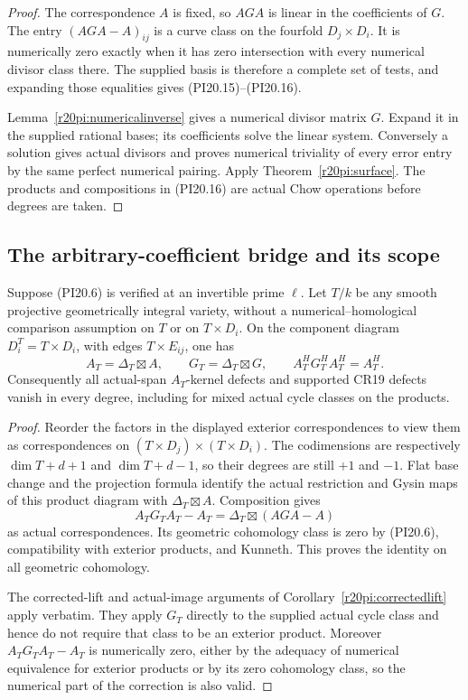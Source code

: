 \begin{proof}
The correspondence $A$ is fixed, so $AGA$ is linear in the
coefficients of $G$.  The entry
$(AGA-A)_{ij}$ is a curve class on the fourfold $D_j\times D_i$.
It is numerically zero exactly when it has zero intersection
with every numerical divisor class there.  The supplied basis
is therefore a complete set of tests, and expanding those
equalities gives (PI20.15)--(PI20.16).

Lemma~\ref{r20pi:numericalinverse} gives a numerical divisor
matrix $G$.  Expand it in the supplied rational bases; its
coefficients solve the linear system.  Conversely a solution
gives actual divisors and proves numerical triviality of every
error entry by the same perfect numerical pairing.  Apply
Theorem~\ref{r20pi:surface}.  The products and compositions in
(PI20.16) are actual Chow operations before degrees are taken.
\end{proof}

\subsection{The arbitrary-coefficient bridge and its scope}

\begin{corollary}
\label{r20pi:coefficient}
Suppose (PI20.6) is verified at an invertible prime $\ell$.
Let $T/k$ be any smooth projective geometrically integral variety,
without a numerical--homological comparison assumption on $T$
or on $T\times D_i$.  On the component diagram
$D_i^T=T\times D_i$, with edges $T\times E_{ij}$, one has
\[
 A_T=\Delta_T\boxtimes A,\qquad
 G_T=\Delta_T\boxtimes G,\qquad
 A_T^HG_T^HA_T^H=A_T^H.
 \tag{PI20.17}\label{r20pi:tensor}
\]
Consequently all actual-span $A_T$-kernel defects and supported
CR19 defects vanish in every degree, including for mixed actual
cycle classes on the products.
\end{corollary}

\begin{proof}
Reorder the factors in the displayed exterior correspondences
to view them as correspondences on
$(T\times D_j)\times(T\times D_i)$.
The codimensions are respectively $\dim T+d+1$ and
$\dim T+d-1$, so their degrees are still $+1$ and $-1$.
Flat base change and the projection formula identify the actual
restriction and Gysin maps of this product diagram with
$\Delta_T\boxtimes A$.  Composition gives
\[
 A_TG_TA_T-A_T
              =\Delta_T\boxtimes(AGA-A)
\]
as actual correspondences.  Its geometric cohomology class is
zero by (PI20.6), compatibility with exterior products, and
Kunneth.  This proves the identity on all geometric cohomology.

The corrected-lift and actual-image arguments of
Corollary~\ref{r20pi:correctedlift} apply verbatim.  They apply
$G_T$ directly to the supplied actual cycle class and hence
do not require that class to be an exterior product.  Moreover
$A_TG_TA_T-A_T$ is numerically zero, either by the adequacy of
numerical equivalence for exterior products or by its zero
cohomology class, so the numerical part of the correction is
also valid.
\end{proof}


